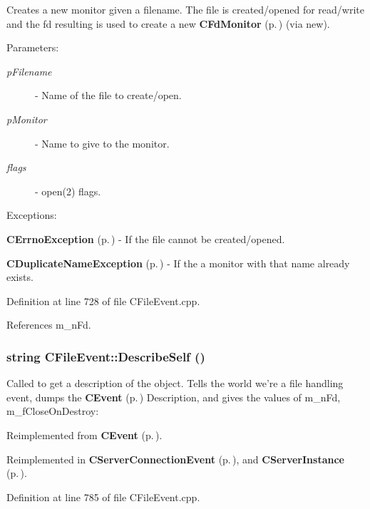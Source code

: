 Creates a new monitor given a filename. The file is created/opened for  read/write and the fd resulting is used to create a new {\bf CFd\-Monitor} {\rm (p.\,\pageref{classCFdMonitor})} (via new).\begin{Desc}
\item[Parameters: ]\par
\begin{description}
\item[{\em 
p\-Filename}]- Name of the file to create/open. \item[{\em 
p\-Monitor}]- Name to give to the monitor. \item[{\em 
flags}]- open(2) flags.\end{description}
\end{Desc}
Exceptions:\begin{CompactItemize}
\item 
{\bf CErrno\-Exception} {\rm (p.\,\pageref{classCErrnoException})} - If the file cannot be created/opened.\item 
{\bf CDuplicate\-Name\-Exception} {\rm (p.\,\pageref{classCDuplicateNameException})} - If the a monitor with that name already exists. \end{CompactItemize}


Definition at line 728 of file CFile\-Event.cpp.

References m\_\-n\-Fd.
\subsubsection{\setlength{\rightskip}{0pt plus 5cm}string CFile\-Event::Describe\-Self ()\hspace{0.3cm}{\tt  [virtual]}}\label{classCFileEvent_a19}


Called to get a description of the object. Tells the world we're a file handling event, dumps the {\bf CEvent} {\rm (p.\,\pageref{classCEvent})} Description,  and gives the values of m\_\-n\-Fd, m\_\-f\-Close\-On\-Destroy: 

Reimplemented from {\bf CEvent} {\rm (p.\,\pageref{classCEvent_a16})}.

Reimplemented in {\bf CServer\-Connection\-Event} {\rm (p.\,\pageref{classCServerConnectionEvent_a14})}, and {\bf CServer\-Instance} {\rm (p.\,\pageref{classCServerInstance_a11})}.

Definition at line 785 of file CFile\-Event.cpp.

